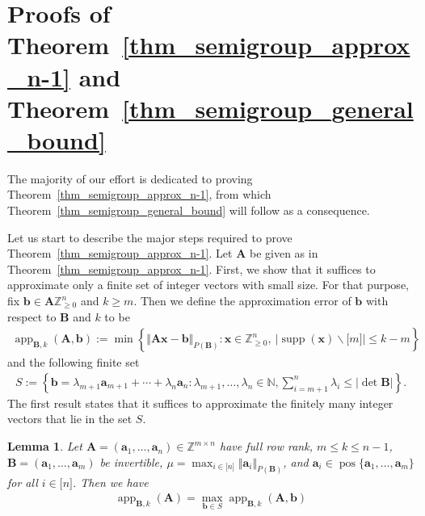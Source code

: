 \documentclass[pdflatex]{sn-jnl}
\DeclareMathOperator{\app}{app}
\DeclareMathOperator{\pos}{pos}
\DeclareMathOperator{\supp}{supp}
\newcommand{\Z}{\mathbb{Z}}
\newcommand{\N}{\mathbb{N}}
\newcommand{\bA}{\bm{A}}
\newcommand{\bx}{\bm{x}}
\newcommand{\bb}{\bm{b}}
\newcommand{\ba}{\bm{a}}
\newcommand{\bB}{\bm{B}}
\theoremstyle{thmstyleone}%
\newtheorem{lemma}{Lemma}
\theoremstyle{thmstyletwo}%
\theoremstyle{thmstylethree}%
\begin{document}
	\section{Proofs of Theorem~\ref{thm_semigroup_approx_n-1} and Theorem~\ref{thm_semigroup_general_bound}}
	\label{s_proof_thm_semigroup_approx_n-1}
	The majority of our effort is dedicated to proving Theorem~\ref{thm_semigroup_approx_n-1}, from which Theorem~\ref{thm_semigroup_general_bound} will follow as a consequence.
	
	Let us start to describe the major steps required to prove Theorem~\ref{thm_semigroup_approx_n-1}. Let $\bA$ be given as in Theorem~\ref{thm_semigroup_approx_n-1}. First, we show that it suffices to approximate only a finite set of integer vectors with small size. For that purpose, fix $\bb\in\bA\Z^n_{\geq 0}$ and $k\geq m$.  Then we define the approximation error of $\bb$ with respect to $\bB$ and $k$ to be
	\begin{align*}
		\app_{\bB,k}(\bA,\bb) := \min \left\lbrace \Vert \bA\bx - \bb\Vert_{P(\bB)} : \bx\in \Z^n_{\geq 0}, \ \left|\supp(\bx)\backslash \lbrack m \rbrack \right|\leq k - m\right\rbrace
	\end{align*}
	and the following finite set 
	\begin{align*}
		S:=\left\lbrace \bb = \lambda_{m+1}\ba_{m+1} + \cdots + \lambda_n\ba_n : \lambda_{m+1},\ldots,\lambda_n\in \N, \sum_{i= m + 1}^n\lambda_{i}\leq \left|\det\bB\right|\right\rbrace.
	\end{align*}
	The first result states that it suffices to approximate the finitely many integer vectors that lie in the set $S$.
	\begin{lemma}
		\label{lemma_general_semigroup_small_vectors}
		Let $\bA = (\ba_1,\ldots,\ba_n)\in\Z^{m\times n}$ have full row rank, $m\leq k\leq n - 1$, $\bB = (\ba_1,\ldots,\ba_m)$ be invertible, $\mu = \max_{i\in\lbrack n\rbrack}\Vert\ba_i\Vert_{P(\bB)}$, and $\ba_i\in\pos\lbrace\ba_1,\ldots,\ba_m\rbrace$ for all $i\in\lbrack n\rbrack$. Then we have 
		\begin{align*}
			\app_{\bB,k}(\bA) = \max_{\bb\in S}\app_{\bB,k}(\bA,\bb)
		\end{align*}
	\end{lemma}
\end{document}
